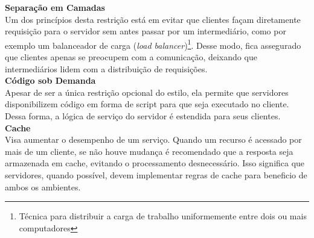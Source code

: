 \textbf{Separação em Camadas} \\

Um dos princípios desta restrição está em evitar que clientes façam diretamente requisição para o servidor sem antes passar por um intermediário, como por exemplo um balanceador de carga (\textit{load balancer})\footnote{
  Técnica para distribuir a carga de trabalho uniformemente entre dois ou mais computadores
}. Desse modo, fica assegurado que clientes apenas se preocupem com a comunicação, deixando que intermediários lidem com a distribuição de requisições. \cite{Fielding2000} \\

\textbf{Código sob Demanda} \\

Apesar de ser a única restrição opcional do estilo, ela permite que servidores disponibilizem código em forma de script para que seja executado no cliente. Dessa forma, a lógica de serviço do servidor é estendida para seus clientes. \cite{Fielding2000} \\

\textbf{Cache} \\

Visa aumentar o desempenho de um serviço. Quando um recurso é acessado por mais de um cliente, se não houve mudança é recomendado que a resposta seja armazenada em cache, evitando o processamento desnecessário. Isso significa que servidores, quando possível, devem implementar regras de cache para beneficio de ambos os ambientes. \cite{Fielding2000}
